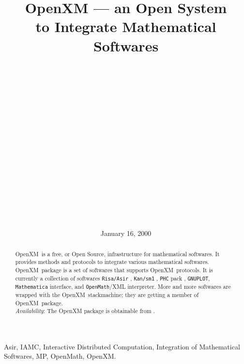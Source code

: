 \documentclass[submit]{acmconf}
\def\OpenXM{{\rm OpenXM\ }}
\begin{document}
\date{January 16, 2000}
\title{OpenXM 
      --- an Open System \\ to Integrate Mathematical Softwares}
\author{\\
         \\
         \\
         \and
         \\
         \\
         \and
         \\
         \\
         \and
         \\
         \\
         \and
         \\
         \\
         \and
         \\
         \\
       }
\maketitle

\begin{abstract}
\OpenXM is a free, or Open Source, infrastructure for mathematical
softwares.
It provides methods and protocols 
to integrate various mathematical softwares.
\OpenXM package is a set of softwares that supports \OpenXM protocols.
It is currently a collection of softwares
{\tt Risa/Asir} \cite{asir}, {\tt Kan/sm1} \cite{kan}, {\tt PHC} pack \cite{phc}, {\tt GNUPLOT},
{\tt Mathematica} interface, and
{\tt OpenMath}/XML \cite{OpenMath} interpreter.
More and more softwares are wrapped with the \OpenXM stackmachine;
they are getting a member of \OpenXM package. \\
{\it Availability}: The OpenXM package is obtainable from \cite{openxm-web}.
\end{abstract}

\begin{keywords}
Asir,
IAMC, Interactive Distributed Computation, 
Integration of Mathematical Softwares,
MP, OpenMath, OpenXM. 
\end{keywords}




















\end{document}
